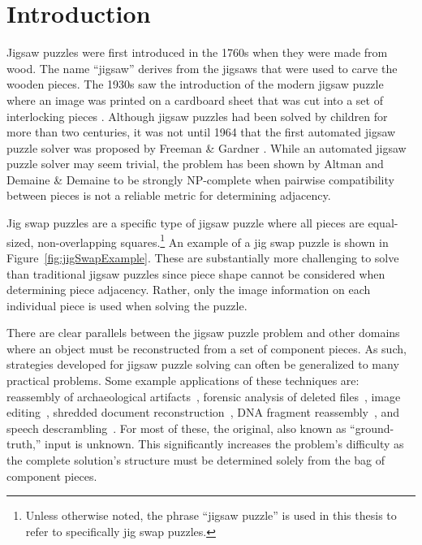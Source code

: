 \chapter{Introduction}\label{sec:introduction}

Jigsaw puzzles were first introduced in the 1760s when they were made from wood.  The name ``jigsaw'' derives from the jigsaws that were used to carve the wooden pieces.   The 1930s saw the introduction of the modern jigsaw puzzle where an image was printed on a cardboard sheet that was cut into a set of interlocking pieces \cite{williams1990, williams2004}.  Although jigsaw puzzles had been solved by children for more than two centuries, it was not until 1964 that the first automated jigsaw puzzle solver was proposed by Freeman \& Gardner \cite{freeman1964}.  While an automated jigsaw puzzle solver may seem trivial, the problem has been shown by Altman \cite{altman1990} and Demaine \& Demaine \cite{demaine2007} to be strongly NP-complete when pairwise compatibility between pieces is not a reliable metric for determining adjacency.

Jig swap puzzles are a specific type of jigsaw puzzle where all pieces are equal-sized, non-overlapping squares.\footnote{Unless otherwise noted, the phrase ``jigsaw puzzle'' is used in this thesis to refer to specifically jig swap puzzles.}  An example of a jig swap puzzle is shown in Figure~\ref{fig:jigSwapExample}.  These are substantially more challenging to solve than traditional jigsaw puzzles since piece shape cannot be considered when determining piece adjacency.  Rather, only the image information on each individual piece is used when solving the puzzle.

There are clear parallels between the jigsaw puzzle problem and other domains where an object must be reconstructed from a set of component pieces.  As such, strategies developed for jigsaw puzzle solving can often be generalized to many practical problems.  Some example applications of these techniques are: reassembly of archaeological artifacts~\cite{brown2008, koller2006}, forensic analysis of deleted files~\cite{garfinkel2010}, image editing~\cite{cho2008}, shredded document reconstruction~\cite{zhu2008}, DNA fragment reassembly~\cite{marande2007}, and speech descrambling~\cite{zhao2007}.  For most of these, the original, also known as ``ground-truth,'' input is unknown.  This significantly increases the problem's difficulty as the complete solution's structure must be determined solely from the bag of component pieces.

